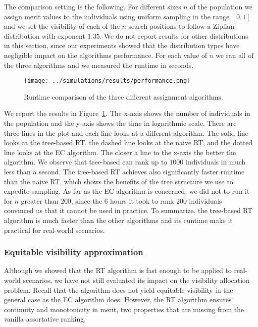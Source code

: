 \documentclass[prodmode,acmec]{acmsmall}
\begin{document}
The comparison setting is the following. For different sizes $n$ of
the population we assign merit values to the individuals using uniform
sampling in the range $[0,1]$ and we set the visibility of each of the
$n$ search positions to follow a Zipfian distribution with exponent
$1.35$. We do not report results for other distributions in this
section, since our experiments showed that the distribution types have
negligible impact on the algorithms performance. For each value of $n$
we ran all of the three algorithms and we measured the runtime in
seconds. 
\begin{figure}[t]
  \centering
  \texttt{[image: ../simulations/results/performance.png]}
  \caption{Runtime comparison of the three different assignment
    algorithms.}
  \label{fig:runtime}
\end{figure} 
We report the results in Figure~\ref{fig:runtime}. The x-axis shows
the number of individuals in the population and the y-axis shows the
time in logarithmic scale. There are three lines in the plot and each
line looks at a different algorithm. The solid line looks at the
tree-based RT, the dashed line looks at the naive RT, and the dotted
line looks at the EC algorithm. The closer a line to the x-axis the
better the algorithm. We observe that tree-based can rank up to $1000$
individuals in much less than a second. The tree-based RT achieves
also significantly faster runtime than the naive RT, which shows the
benefits of the tree structure we use to expedite sampling. As far as
the EC algorithm is concerned, we did not to run it for $n$ greater
than $200$, since the $6$ hours it took to rank $200$ individuals
convinced us that it cannot be used in practice. To summarize, the
tree-based RT algorithm is much faster than the other algorithms and
its runtime make it practical for real-world scenarios.


\subsubsection{Equitable visibility approximation}
\label{sec:expr-approximation}
Although we showed that the RT algorithm is fast enough to be applied
to real-world scenarios, we have not still evaluated its impact on the
visibility allocation problem. Recall that the algorithm does not
yield equitable visibility in the general case as the EC algorithm
does. However, the RT algorithm ensures continuity and monotonicity in
merit, two properties that are missing from the vanilla assortative
ranking.
\end{document}
